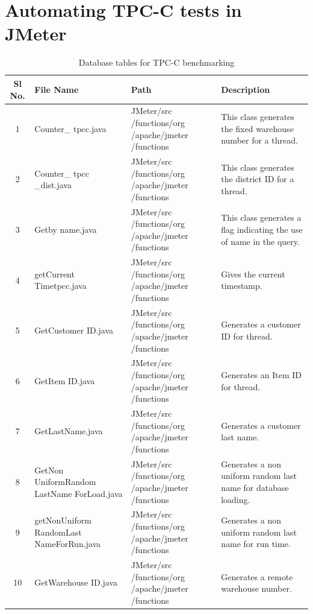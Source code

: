 \documentclass[12pt]{book}
\begin{document}
 \section{Automating TPC-C tests in JMeter}
  \begin{table}[H]
  \begin{center}
   \begin{tabular}{|c|p{3cm}|p{4cm}|p{6cm}|} 
   \hline
   \textbf{Sl No.} & \textbf{File Name} & \textbf{Path} & \textbf{Description}\\
   \hline
   1 & Counter\_ tpcc.java & JMeter/src /functions/org /apache/jmeter /functions & This class generates the fixed warehouse number for a thread.\\
   \hline
   2 & Counter\_ tpcc \_dist.java & JMeter/src /functions/org /apache/jmeter /functions & This class generates the district ID for a thread.\\
   \hline
   3 & Getby name.java & JMeter/src /functions/org /apache/jmeter /functions & This class generates a flag indicating the use of name in the query.\\
   \hline
   4 & getCurrent Timetpcc.java & JMeter/src /functions/org /apache/jmeter /functions & Gives the current timestamp.\\
   \hline
   5 & GetCustomer ID.java & JMeter/src /functions/org /apache/jmeter /functions & Generates a customer ID for thread.\\
   \hline 
   6 & GetItem ID.java & JMeter/src /functions/org /apache/jmeter /functions & Generates an Item ID for thread.\\
   \hline 
   7 & GetLastName.java & JMeter/src /functions/org /apache/jmeter /functions & Generates a customer last name.\\
   \hline
   8 & GetNon UniformRandom LastName ForLoad.java & JMeter/src /functions/org /apache/jmeter /functions & Generates a non uniform random last name for database loading.\\
   \hline
   9 & getNonUniform RandomLast NameForRun.java & JMeter/src /functions/org /apache/jmeter /functions & Generates a non uniform random last name for run time.\\
   \hline
   10 & GetWarehouse ID.java & JMeter/src /functions/org /apache/jmeter /functions & Generates a remote warehouse number.\\
   \hline 
     \end{tabular}
   \caption{Database tables for TPC-C benchmarking}
  \end{center}
 \end{table}
\end{document}
